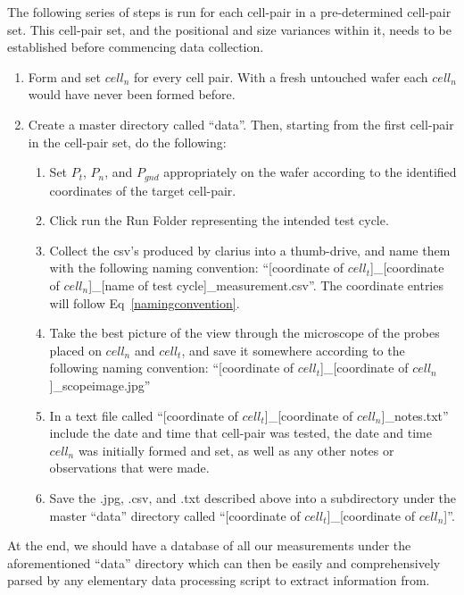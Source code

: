 \documentclass{article}
\begin{document}
        The following series of steps is run for each cell-pair in a pre-determined cell-pair set. This cell-pair set,
        and the positional and size variances within it, needs to be established before commencing data collection.

        \begin{enumerate}
          \item Form and set $cell_n$ for every cell pair. With a fresh untouched wafer each $cell_n$ would have never
            been formed before.
          \item Create a master directory called ``data''. Then, starting from the first cell-pair in the cell-pair set,
            do the following:
          \begin{enumerate}
            \item Set $P_t$, $P_n$, and $P_{gnd}$ appropriately on the wafer according to the identified coordinates of
              the target cell-pair.
            \item Click run the Run Folder representing the intended test cycle.
            \item Collect the csv's produced by clarius into a thumb-drive, and name them with the following naming
              convention: ``[coordinate of $cell_t$]\_[coordinate of $cell_n$]\_[name of test cycle]\_measurement.csv''.
              The coordinate entries will follow Eq~\ref{namingconvention}.
            \item Take the best picture of the view through the microscope of the probes placed on $cell_n$ and
              $cell_t$, and save it somewhere according to the following naming convention: ``[coordinate of
              $cell_t$]\_[coordinate of $cell_n$]\_scopeimage.jpg''
            \item In a text file called ``[coordinate of $cell_t$]\_[coordinate of $cell_n$]\_notes.txt'' include the
              date and time that cell-pair was tested, the date and time $cell_n$ was initially formed and set, as well
              as any other notes or observations that were made.
            \item Save the .jpg, .csv, and .txt described above into a subdirectory under the master ``data'' directory
              called ``[coordinate of $cell_t$]\_[coordinate of $cell_n$]''.
          \end{enumerate}
        \end{enumerate}

        At the end, we should have a database of all our measurements under the aforementioned ``data'' directory which
        can then be easily and comprehensively parsed by any elementary data processing script to extract information
        from.
\end{document}
